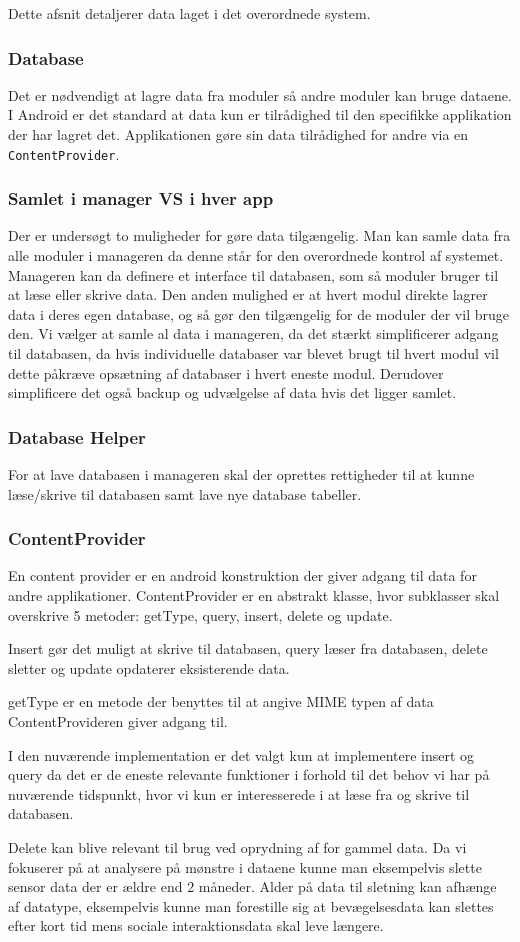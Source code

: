 Dette afsnit detaljerer data laget i det overordnede system. 

\subsubsection{Database}
Det er nødvendigt at lagre data fra moduler så andre moduler kan bruge dataene.
I Android er det standard at data kun er tilrådighed til den specifikke applikation der har lagret det.
Applikationen gøre sin data tilrådighed for andre via en \texttt{ContentProvider}.

\subsubsection{Samlet i manager VS i hver app}
Der er undersøgt to muligheder for gøre data tilgængelig.
Man kan samle data fra alle moduler i manageren da denne står for den overordnede kontrol af systemet. 
Manageren kan da definere et interface til databasen, som så moduler bruger til at læse eller skrive data. 
Den anden mulighed er at hvert modul direkte lagrer data i deres egen database, og så gør den tilgængelig for de moduler der vil bruge den.
Vi vælger at samle al data i manageren, da det stærkt simplificerer adgang til databasen, da hvis individuelle databaser var blevet brugt til hvert modul vil dette påkræve opsætning af databaser i hvert eneste modul.
Derudover simplificere det også backup og udvælgelse af data hvis det ligger samlet.

\subsubsection{Database Helper}
For at lave databasen i manageren skal der oprettes rettigheder til at kunne læse/skrive til databasen samt lave nye database tabeller.

\subsubsection{ContentProvider}
En content provider er en android konstruktion der giver adgang til data for andre applikationer.
ContentProvider er en abstrakt klasse, hvor subklasser skal overskrive 5 metoder:  getType, query, insert, delete og update. \cite{contentprovider}

Insert gør det muligt at skrive til databasen, query læser fra databasen, delete sletter og update opdaterer eksisterende data.

getType er en metode der benyttes til at angive MIME typen af data ContentProvideren giver adgang til.

I den nuværende implementation er det valgt kun at implementere insert og query da det er de eneste relevante funktioner i forhold til det behov vi har på nuværende tidspunkt, hvor vi kun er interesserede i at læse fra og skrive til databasen.

Delete kan blive relevant til brug ved oprydning af for gammel data. Da vi fokuserer på at analysere på mønstre i dataene kunne man eksempelvis slette sensor data der er ældre end 2 måneder. 
Alder på data til sletning kan afhænge af datatype, eksempelvis kunne man forestille sig at bevægelsesdata kan slettes efter kort tid mens sociale interaktionsdata skal leve længere.